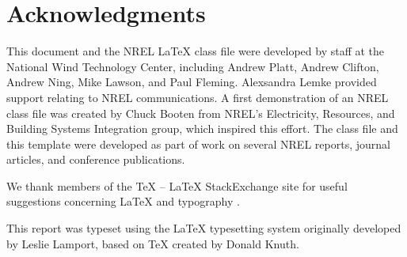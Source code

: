 \chapter*{Acknowledgments}
This document and the NREL LaTeX class file were developed by staff at the National Wind Technology Center, including Andrew Platt, Andrew Clifton, Andrew Ning, Mike Lawson, and Paul Fleming. Alexsandra Lemke provided support relating to NREL communications. A first demonstration of an NREL class file was created by Chuck Booten from NREL's Electricity, Resources, and Building Systems Integration group, which inspired this effort. The class file and this template were developed as part of work on several NREL reports, journal articles, and conference publications. 

We thank members of the TeX -- LaTeX StackExchange site for useful suggestions concerning LaTeX and typography \cite{texstackexchange}.

This report was typeset using the LaTeX typesetting system originally developed by Leslie Lamport, based on TeX created by Donald Knuth.
